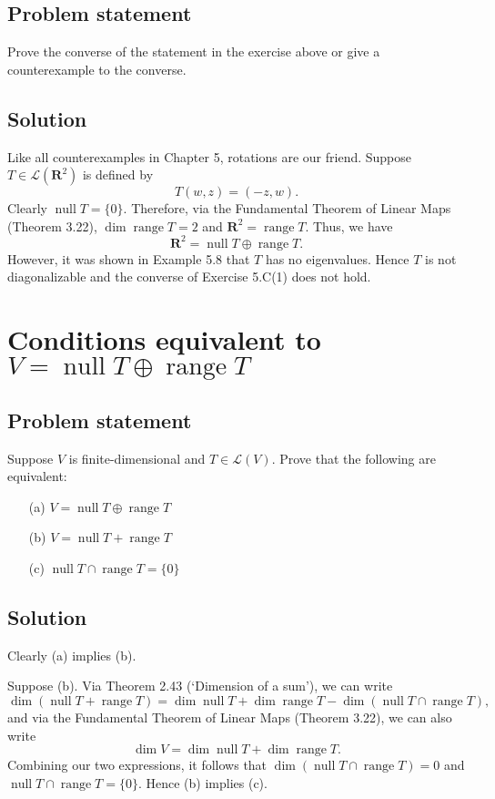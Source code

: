 \documentclass{article}
\begin{document}
\subsection*{Problem statement}
Prove the converse of the statement in the exercise above or give a counterexample to the converse.

\subsection*{Solution}
Like all counterexamples in Chapter 5, rotations are our friend.
Suppose $T\in\mathcal{L}(\mathbf{R}^2)$ is defined by
\[T(w,z)=(-z,w).\]
Clearly $\operatorname{null}T=\{0\}$. 
Therefore, via the Fundamental Theorem of Linear Maps (Theorem 3.22), $\operatorname{dim}\operatorname{range}T=2$ and $\mathbf{R}^2=\operatorname{range}T$. 
Thus, we have 
\[\mathbf{R}^2=\operatorname{null}T\oplus\operatorname{range}T.\]
However, it was shown in Example 5.8 that $T$ has no eigenvalues. 
Hence $T$ is not diagonalizable and the converse of Exercise 5.C(1) does not hold.

\clearpage

\section{Conditions equivalent to $V=\operatorname{null}T\oplus\operatorname{range}T$}
\subsection*{Problem statement}
Suppose $V$ is finite-dimensional and $T\in\mathcal{L}(V)$. 
Prove that the following are equivalent:
\begin{itemize}
    \item[(a)] $V=\operatorname{null}T\oplus\operatorname{range}T$
    \item[(b)] $V=\operatorname{null}T+\operatorname{range}T$
    \item[(c)] $\operatorname{null}T\cap \operatorname{range}T=\{0\}$
\end{itemize}

\subsection*{Solution}
Clearly (a) implies (b). 

Suppose (b). 
Via Theorem 2.43 (`Dimension of a sum'), we can write
\[\dim(\operatorname{null}T+\operatorname{range}T)=\dim\operatorname{null}T+\dim\operatorname{range}T-\dim(\operatorname{null}T\cap \operatorname{range}T),\]
and via the Fundamental Theorem of Linear Maps (Theorem 3.22), we can also write
\[\dim V=\dim\operatorname{null}T+\dim\operatorname{range}T.\]
Combining our two expressions, it follows that $\dim(\operatorname{null}T\cap \operatorname{range}T)=0$ and $\operatorname{null}T\cap \operatorname{range}T=\{0\}$. Hence (b) implies (c).
\end{document}
